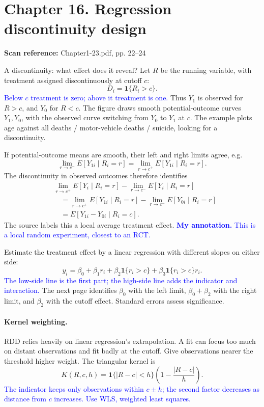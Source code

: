 \documentclass[11pt,a4paper]{article}
\newcommand{\sourcepages}[1]{\par{\small\sffamily\color{muted}\textbf{Scan reference:} #1\par}\nobreak\smallskip\nopagebreak[4]}
\newcommand{\inkblue}[1]{\textcolor{blue}{#1}}
\begin{document}
{\section{Chapter 16. Regression discontinuity design}
\sourcepages{Chapter1-23.pdf, pp. 22--24}
A discontinuity: what effect does it reveal? Let $R$ be the running variable, with treatment assigned discontinuously at cutoff $c$:
\[D_i=\mathbf1\{R_i>c\}.\]
\inkblue{Below $c$ treatment is zero; above it treatment is one.} Thus $Y_1$ is observed for $R>c$, and $Y_0$ for $R<c$. The figure draws smooth potential-outcome curves $Y_1,Y_0$, with the observed curve switching from $Y_0$ to $Y_1$ at $c$. The example plots age against all deaths / motor-vehicle deaths / suicide, looking for a discontinuity.

If potential-outcome means are smooth, their left and right limits agree, e.g.
\[\lim_{r\to c^-}E[Y_{1i}\mid R_i=r]=\lim_{r\to c^+}E[Y_{1i}\mid R_i=r].\]
The discontinuity in observed outcomes therefore identifies
\begin{align*}
&\lim_{r\to c^+}E[Y_i\mid R_i=r]-\lim_{r\to c^-}E[Y_i\mid R_i=r]\\
&\quad=\lim_{r\to c^+}E[Y_{1i}\mid R_i=r]-\lim_{r\to c^-}E[Y_{0i}\mid R_i=r]\\
&\quad=E[Y_{1i}-Y_{0i}\mid R_i=c].
\end{align*}
The source labels this a local average treatment effect. \inkblue{\textbf{My annotation.} This is a local random experiment, closest to an RCT.}

Estimate the treatment effect by a linear regression with different slopes on either side:
\[y_i=\beta_0+\beta_1r_i+\beta_2\mathbf1\{r_i>c\}+\beta_3\mathbf1\{r_i>c\}r_i.\]
\inkblue{The low-side line is the first part; the high-side line adds the indicator and interaction.} The next page identifies $\beta_0$ with the left limit, $\beta_0+\beta_2$ with the right limit, and $\beta_2$ with the cutoff effect.  Standard errors assess significance.

\paragraph{Kernel weighting.}
RDD relies heavily on linear regression's extrapolation. A fit can focus too much on distant observations and fit badly at the cutoff. Give observations nearer the threshold higher weight. The triangular kernel is
\[K(R,c,h)=\mathbf1\{|R-c|<h\}\left(1-\frac{|R-c|}{h}\right).\]
\inkblue{The indicator keeps only observations within $c\pm h$; the second factor decreases as distance from $c$ increases. Use WLS, weighted least squares.}

}
\end{document}
